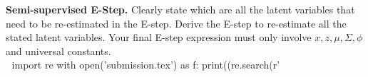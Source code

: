 \item{} \textbf{Semi-supervised E-Step.}
Clearly state which are all the latent variables that need to be re-estimated in the E-step. Derive the E-step to re-estimate all the stated latent variables. Your final E-step expression must only involve $x, z, \mu, \Sigma, \phi$ and universal constants.\\

🐍
import re
with open('submission.tex') as f: print((re.search(r'%
🐍
